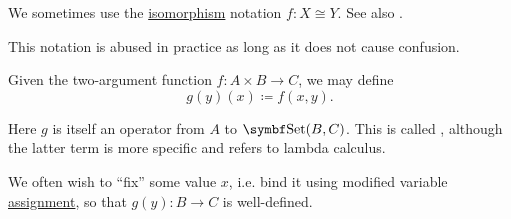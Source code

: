 \begin{definition}
\begin{DefEnum}
    We sometimes use the \hyperref[def:morphism_invertibility/isomorphism]{isomorphism} notation \( f: X \cong Y \). See also .
  \end{DefEnum}
\end{definition}

\begin{definition}\label{def:currying}
  This notation is abused in practice as long as it does not cause confusion.

  Given the two-argument function \( f: A \times B \to C \), we may define
  \begin{equation*}
    g(y)(x) \coloneqq f(x, y).
  \end{equation*}

  Here \( g \) is itself an operator from \( A \) to \( \Cat{Set}(B, C) \). This is called , although the latter term is more specific and refers to lambda calculus.

  We often wish to \enquote{fix} some value \( x \), i.e. bind it using modified variable \hyperref[def:first_order_variable_assignment]{assignment}, so that \( g(y): B \to C \) is well-defined.
\end{definition}

